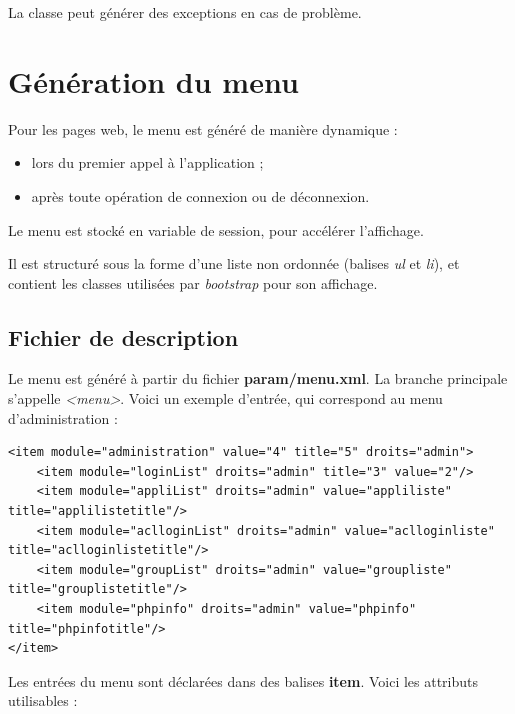 La classe peut générer des exceptions en cas de problème.

\chapter{Génération du menu}
Pour les pages web, le menu est généré de manière dynamique :
\begin{itemize}
\item lors du premier appel à l'application ;
\item après toute opération de connexion ou de déconnexion.
\end{itemize}

Le menu est stocké en variable de session, pour accélérer l'affichage.

Il est structuré sous la forme d'une liste non ordonnée (balises \textit{ul} et \textit{li}), et contient les classes utilisées par \textit{bootstrap} pour son affichage.

\section{Fichier de description}

Le menu est généré à partir du fichier \textbf{param/menu.xml}. La branche principale s'appelle \textit{<menu>}. Voici un exemple d'entrée, qui correspond au menu d'administration :

\begin{lstlisting}
<item module="administration" value="4" title="5" droits="admin">
	<item module="loginList" droits="admin" title="3" value="2"/>
	<item module="appliList" droits="admin" value="appliliste" title="applilistetitle"/>
	<item module="aclloginList" droits="admin" value="aclloginliste" title="aclloginlistetitle"/>
	<item module="groupList" droits="admin" value="groupliste" title="grouplistetitle"/>
	<item module="phpinfo" droits="admin" value="phpinfo" title="phpinfotitle"/>
</item>
\end{lstlisting}

Les entrées du menu sont déclarées dans des balises \textbf{item}. Voici les attributs utilisables :

